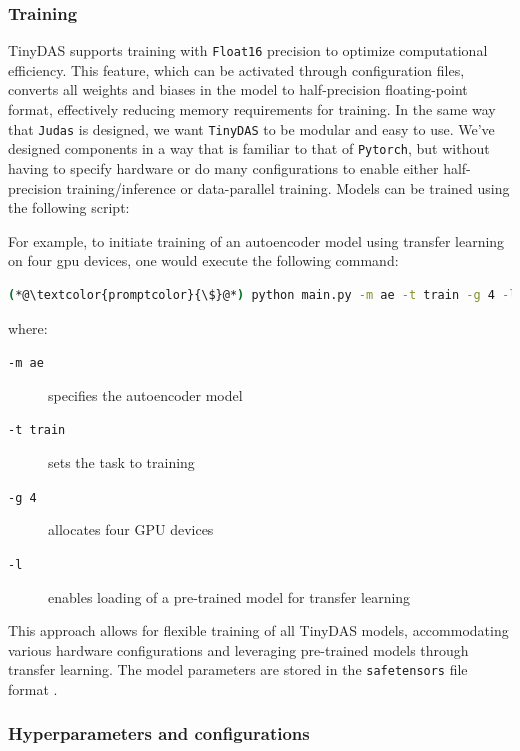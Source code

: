 \subsubsection{Training}

TinyDAS supports training with \texttt{Float16} precision to optimize computational efficiency. This feature, which can be activated through configuration files, converts all weights and biases in the model to half-precision floating-point format, effectively reducing memory requirements for training. In the same way that \texttt{Judas} is designed, we want \texttt{TinyDAS} to be modular and easy to use. We've designed components in a way that is familiar to that of \texttt{Pytorch}\cite{paszke2019pytorch}, but without having to specify hardware or do many configurations to enable either half-precision training/inference or data-parallel training. Models can be trained using the following script:





For example, to initiate training of an autoencoder model using transfer learning on four \acrshort{gpu} devices, one would execute the following command:
\begin{lstlisting}[style=shellcommand, language=bash]
(*@\textcolor{promptcolor}{\$}@*) python main.py -m ae -t train -g 4 -l
\end{lstlisting}

where:
\begin{description}
\item[\texttt{-m ae}] specifies the autoencoder model
\item[\texttt{-t train}] sets the task to training
\item[\texttt{-g 4}] allocates four GPU devices
\item[\texttt{-l}] enables loading of a pre-trained model for transfer learning
\end{description}

This approach allows for flexible training of all TinyDAS models, accommodating various hardware configurations and leveraging pre-trained models through transfer learning. The model parameters are stored in the \texttt{safetensors} file format \cite{safetensors}.

\subsubsection{Hyperparameters and configurations}

